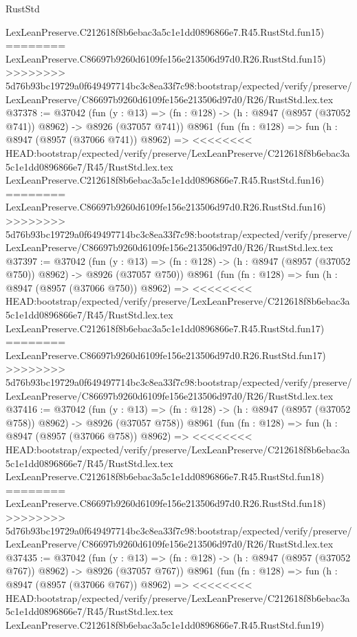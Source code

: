 \begin{lexlean}{RustStd}
\begin{coremodule}
{\begin{coremodule}
{{{{{{{{{{{{{{{{{{{{{{{{{{{{{{{{{{{{{{{    LexLeanPreserve.C212618f8b6ebac3a5c1e1dd0896866e7.R45.RustStd.fun15)
========
    LexLeanPreserve.C86697b9260d6109fe156e213506d97d0.R26.RustStd.fun15)
>>>>>>>> 5d76b93bc19729a0f649497714bc3c8ea33f7c98:bootstrap/expected/verify/preserve/LexLeanPreserve/C86697b9260d6109fe156e213506d97d0/R26/RustStd.lex.tex
@37378 := @37042
    (fun (y : @13) => (fn : @128) -> (h : @8947 (@8957 (@37052 @741)) @8962) -> @8926 (@37057 @741))
    @8961
    (fun (fn : @128) =>
    fun (h : @8947 (@8957 (@37066 @741)) @8962) =>
<<<<<<<< HEAD:bootstrap/expected/verify/preserve/LexLeanPreserve/C212618f8b6ebac3a5c1e1dd0896866e7/R45/RustStd.lex.tex
    LexLeanPreserve.C212618f8b6ebac3a5c1e1dd0896866e7.R45.RustStd.fun16)
========
    LexLeanPreserve.C86697b9260d6109fe156e213506d97d0.R26.RustStd.fun16)
>>>>>>>> 5d76b93bc19729a0f649497714bc3c8ea33f7c98:bootstrap/expected/verify/preserve/LexLeanPreserve/C86697b9260d6109fe156e213506d97d0/R26/RustStd.lex.tex
@37397 := @37042
    (fun (y : @13) => (fn : @128) -> (h : @8947 (@8957 (@37052 @750)) @8962) -> @8926 (@37057 @750))
    @8961
    (fun (fn : @128) =>
    fun (h : @8947 (@8957 (@37066 @750)) @8962) =>
<<<<<<<< HEAD:bootstrap/expected/verify/preserve/LexLeanPreserve/C212618f8b6ebac3a5c1e1dd0896866e7/R45/RustStd.lex.tex
    LexLeanPreserve.C212618f8b6ebac3a5c1e1dd0896866e7.R45.RustStd.fun17)
========
    LexLeanPreserve.C86697b9260d6109fe156e213506d97d0.R26.RustStd.fun17)
>>>>>>>> 5d76b93bc19729a0f649497714bc3c8ea33f7c98:bootstrap/expected/verify/preserve/LexLeanPreserve/C86697b9260d6109fe156e213506d97d0/R26/RustStd.lex.tex
@37416 := @37042
    (fun (y : @13) => (fn : @128) -> (h : @8947 (@8957 (@37052 @758)) @8962) -> @8926 (@37057 @758))
    @8961
    (fun (fn : @128) =>
    fun (h : @8947 (@8957 (@37066 @758)) @8962) =>
<<<<<<<< HEAD:bootstrap/expected/verify/preserve/LexLeanPreserve/C212618f8b6ebac3a5c1e1dd0896866e7/R45/RustStd.lex.tex
    LexLeanPreserve.C212618f8b6ebac3a5c1e1dd0896866e7.R45.RustStd.fun18)
========
    LexLeanPreserve.C86697b9260d6109fe156e213506d97d0.R26.RustStd.fun18)
>>>>>>>> 5d76b93bc19729a0f649497714bc3c8ea33f7c98:bootstrap/expected/verify/preserve/LexLeanPreserve/C86697b9260d6109fe156e213506d97d0/R26/RustStd.lex.tex
@37435 := @37042
    (fun (y : @13) => (fn : @128) -> (h : @8947 (@8957 (@37052 @767)) @8962) -> @8926 (@37057 @767))
    @8961
    (fun (fn : @128) =>
    fun (h : @8947 (@8957 (@37066 @767)) @8962) =>
<<<<<<<< HEAD:bootstrap/expected/verify/preserve/LexLeanPreserve/C212618f8b6ebac3a5c1e1dd0896866e7/R45/RustStd.lex.tex
    LexLeanPreserve.C212618f8b6ebac3a5c1e1dd0896866e7.R45.RustStd.fun19)
}}}}}}}}}}}}}}}}}}}}}}}}}}}}}}}}}}}}}}}
\end{coremodule}}
\end{coremodule}
\end{lexlean}
